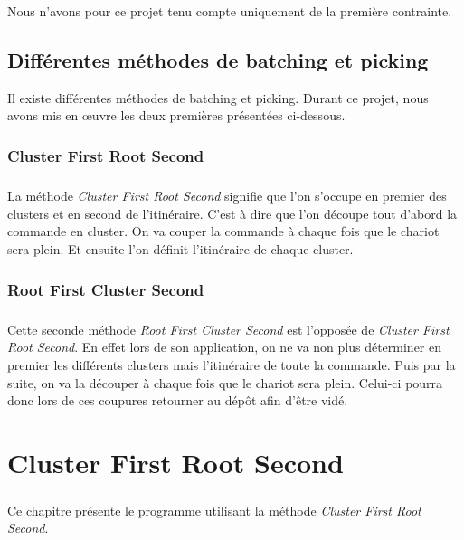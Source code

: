 \documentclass[twoside,UTF8]{EPURapport}
\begin{document}
Nous n'avons pour ce projet tenu compte uniquement de la première contrainte.

\section{Différentes méthodes de batching et picking}

Il existe différentes méthodes de batching et picking. Durant ce projet, nous avons mis en œuvre les deux premières présentées ci-dessous.

\subsection{Cluster First Root Second}
\label{sec:CFRS}

\paragraph{}La méthode \textit{Cluster First Root Second} signifie que l'on s'occupe en premier des clusters et en second de l'itinéraire. C'est à dire que l'on découpe tout d'abord la commande en cluster. On va couper la commande à chaque fois que le chariot sera plein. Et ensuite l'on définit l'itinéraire de chaque cluster. 

\subsection{Root First Cluster Second}
\label{sec:RFCS}
\paragraph{}Cette seconde méthode \textit{Root First Cluster Second} est l'opposée de \textit{Cluster First Root Second}. En effet lors de son application, on ne va non plus déterminer en premier les différents clusters mais l'itinéraire de toute la commande. Puis par la suite, on va la découper à chaque fois que le chariot sera plein. Celui-ci pourra donc lors de ces coupures retourner au dépôt afin d'être vidé.





\chapter{Cluster First Root Second}

\paragraph{} Ce chapitre présente le programme utilisant la méthode \textit{Cluster First Root Second}. 
\end{document}
